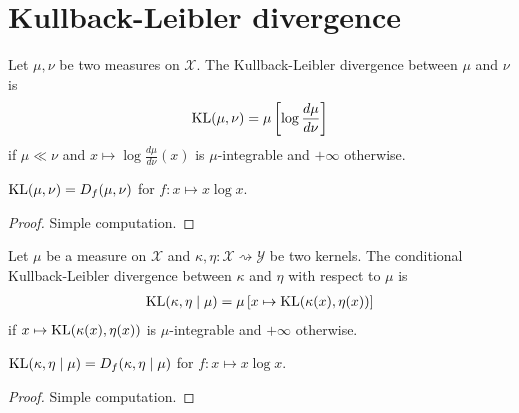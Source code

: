 \chapter{Kullback-Leibler divergence}

\begin{definition}
  \label{def:KL}
  \leanok
  Let $\mu, \nu$ be two measures on $\mathcal X$. The Kullback-Leibler divergence between $\mu$ and $\nu$ is
  \begin{align*}
  \operatorname{KL}(\mu, \nu) = \mu\left[\log \frac{d \mu}{d \nu}\right]
  \end{align*}
  if $\mu \ll \nu$ and $x \mapsto \log \frac{d \mu}{d \nu}(x)$ is $\mu$-integrable and $+\infty$ otherwise.
\end{definition}

\begin{lemma}
  \label{lem:kl_eq_fDiv}
  \leanok
  $\operatorname{KL}(\mu, \nu) = D_f(\mu, \nu)$ for $f: x \mapsto x \log x$.
\end{lemma}

\begin{proof}\leanok
Simple computation.
\end{proof}

\begin{definition}
  \label{def:condKL}
  \leanok
  Let $\mu$ be a measure on $\mathcal X$ and $\kappa, \eta : \mathcal X \rightsquigarrow \mathcal Y$ be two kernels. The conditional Kullback-Leibler divergence between $\kappa$ and $\eta$ with respect to $\mu$ is
  \begin{align*}
  \operatorname{KL}(\kappa, \eta \mid \mu) = \mu\left[x \mapsto \operatorname{KL}(\kappa(x), \eta(x))\right]
  \end{align*}
  if $x \mapsto \operatorname{KL}(\kappa(x), \eta(x))$ is $\mu$-integrable and $+\infty$ otherwise.
\end{definition}

\begin{lemma}
  \label{lem:condKL_eq_condFDiv}
  \leanok
  $\operatorname{KL}(\kappa, \eta \mid \mu) = D_f(\kappa, \eta \mid \mu)$ for $f: x \mapsto x \log x$.
\end{lemma}

\begin{proof}\leanok
Simple computation.
\end{proof}

